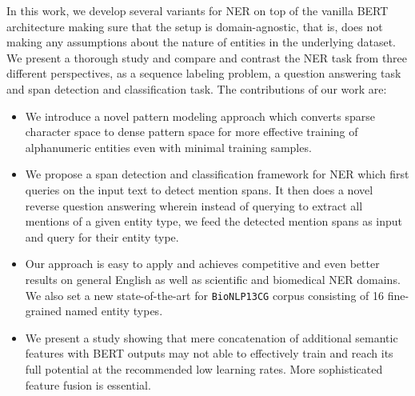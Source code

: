     

In this work, we develop several variants for NER on top of the vanilla BERT architecture making sure that the setup is domain-agnostic, that is, does not making any assumptions about the nature of entities in the underlying dataset. We present a thorough study and compare and contrast the NER task from three different perspectives, as a sequence labeling problem, a question answering task and span detection and classification task. The contributions of our work are:

\begin{itemize}
    \item We introduce a novel pattern modeling approach which converts sparse character space to dense pattern space for more effective training of alphanumeric entities even with minimal training samples.
    
    \item We propose a span detection and classification framework for NER which first queries on the input text to detect mention spans. It then does a novel reverse question answering wherein instead of querying to extract all mentions of a given entity type, we feed the detected mention spans as input and query for their entity type. 
    
    \item Our approach is easy to apply and achieves competitive and even better results on general English as well as scientific and biomedical NER domains. We also set a new state-of-the-art for \texttt{BioNLP13CG} corpus consisting of 16 fine-grained named entity types.
    
    \item We present a study showing that mere concatenation of additional semantic features with BERT outputs may not able to effectively train and reach its full potential at the recommended low learning rates. More sophisticated feature fusion is essential.
\end{itemize}

